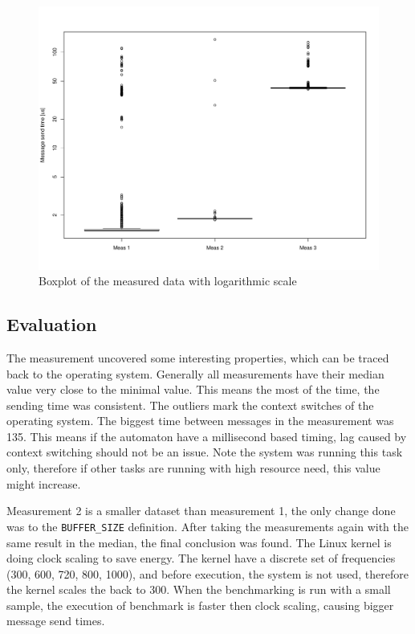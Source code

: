 \begin{figure}[h]
	\centering
	\includegraphics[width = \textwidth]{include/figures/rpmsg_boxplot}
	\caption{Boxplot of the measured data with logarithmic scale}
\label{fig:rpmsg_boxplot}
\end{figure}

\subsection{Evaluation}

The measurement uncovered some interesting properties, which can be traced back to the operating system. Generally all measurements have their median value very close to the minimal value. This means the most of the time, the sending time was consistent. The outliers mark the context switches of the operating system. The biggest time between messages in the measurement was \si{135}{\mics}. This means if the automaton have a millisecond based timing, lag caused by context switching should not be an issue. Note the system was running this task only, therefore if other tasks are running with high resource need, this value might increase.

Measurement 2 is a smaller dataset than measurement 1, the only change done was to the \texttt{BUFFER\_SIZE} definition. After taking the measurements again with the same result in the median, the final conclusion was found. The Linux kernel is doing clock scaling to save energy. The kernel have a discrete set of frequencies (\si{300}{\MHz}, \si{600}{\MHz}, \si{720}{\MHz}, \si{800}{\MHz}, \si{1000}{\MHz}), and before execution, the system is not used, therefore the kernel scales the \cpu{} back to \si{300}{\MHz}. When the benchmarking is run with a small sample, the execution of benchmark is faster then clock scaling, causing bigger message send times.

